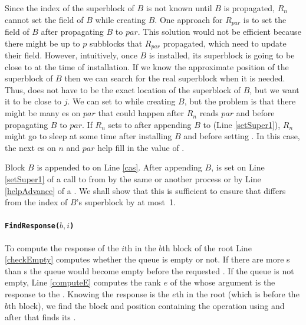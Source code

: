 Since the index of the superblock of ${B}$ is not known until $B$ is
propagated, $R_n$ cannot set the  field of ${B}$ while
creating $B$. One approach for $R_{par}$ is to set the 
field of ${B}$ after propagating $B$ to $par$. This solution would not
be efficient because there might be up to $p$ subblocks that $R_{par}$
propagated, which need to update their  field. However,
intuitively, once $B$ is installed, its superblock is going to be
close to  at the time of installation. If we know
the approximate position of the superblock of $B$ then we can search
for the real superblock when it is needed. Thus,  does
not have to be the exact location of  the superblock of $B$, but we
want it to be close to $j$. We can set  to
 while creating $B$, but the problem is that there
might be many es on $par$ that could happen after $R_n$
reads $par$ and before propagating $B$ to $par$. If $R_n$
sets  to  after appending $B$ to
 (Line \ref{setSuper1}), $R_n$ might go to sleep at
some time after installing $B$ and before setting . In
this case, the next es on $n$ and $par$ help fill in the
value of . 

Block $B$ is appended to  on Line \ref{cas}. After
appending $B$,  is set on Line \ref{setSuper1} of a call
to  from  by the same or another process
or by Line \ref{helpAdvance} of a . We shall
show that this is sufficient to ensure that  differs
from the index of $B$'s superblock by at most~1. 

\paragraph{\tt{FindResponse($b, i$)}}
To compute the response of the $i$th  in the $b$th block
of the root Line \ref{checkEmpty} computes whether the queue is empty
or not. If there are more s than s the queue
would become empty before the requested . If the queue is
not empty, Line \ref{computeE} computes the rank $e$ of the
 whose argument is the response to the
. Knowing the response is the $e$th  in the
root (which is before the $b$th block), we find the block and position
containing the  operation using  and
after that  finds its . 

